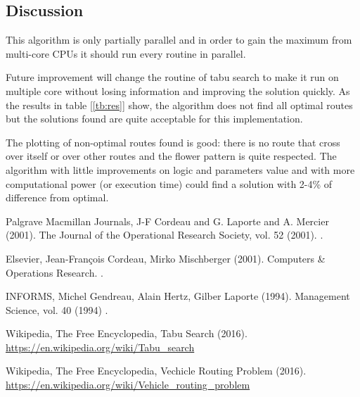\documentclass[twoside]{article}
\begin{document}
\begin{multicols}{2}
\section{Discussion}
This algorithm is only partially parallel and in order to gain the maximum from multi-core CPUs it should run every routine in parallel. 

Future improvement will change the routine of tabu search to make it run on multiple core without losing information and improving the solution quickly.\newline
As the results in table [\ref{tb:res}] show, the algorithm does not find all optimal routes but the solutions found are quite acceptable for this implementation. 

The plotting of non-optimal routes found is good: there is no route that cross over itself or over other routes and the flower pattern is quite respected.\newline
The algorithm with little improvements on logic and parameters value and with more computational power (or execution time) could find a solution with 2-4\% of difference from optimal.


\begin{thebibliography}{5} %

Palgrave Macmillan Journals, J-F Cordeau and G. Laporte and A. Mercier (2001).
\newblock The Journal of the Operational Research Society, vol. 52 (2001).
.

Elsevier, Jean-François Cordeau, Mirko Mischberger (2001).
\newblock Computers \& Operations Research.
.

INFORMS, Michel Gendreau, Alain Hertz, Gilber Laporte (1994).
\newblock Management Science, vol. 40 (1994)
.

Wikipedia, The Free Encyclopedia, Tabu Search (2016).
\newblock \url{https://en.wikipedia.org/wiki/Tabu_search}

Wikipedia, The Free Encyclopedia, Vechicle Routing Problem (2016).
\newblock \url{https://en.wikipedia.org/wiki/Vehicle_routing_problem}

\end{thebibliography}


\end{multicols}
\end{document}
